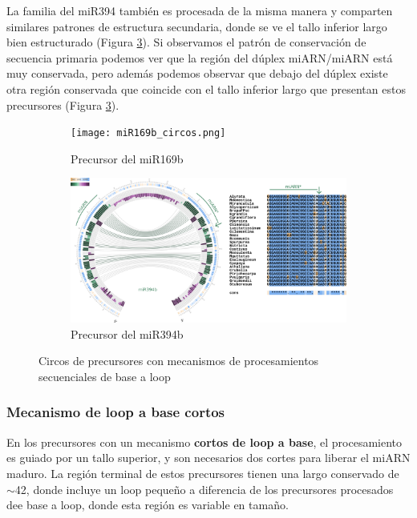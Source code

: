 La familia del miR394 también es procesada de la misma manera y comparten similares patrones de estructura secundaria, donde se ve el tallo inferior largo bien estructurado (Figura \ref{fig:seqBTL_circos}).
Si observamos el patrón de conservación de secuencia primaria podemos ver que la región del dúplex miARN/miARN está muy conservada, pero además podemos observar que debajo del dúplex existe otra región conservada que coincide con el tallo inferior largo que presentan estos precursores (Figura \ref{fig:seqBTL_circos}).


\begin{landscape}
	\begin{figure}
	\centering
	\begin{subfigure}{.75\textwidth}
	  \centering
	  \texttt{[image: miR169b\_circos.png]}
	  \caption{Precursor del miR169b}
	  \label{subfig:miR169b_circos}
	\end{subfigure}%
	\begin{subfigure}{.75\textwidth}
	  \centering
	  \includegraphics[width=.9\linewidth]{miR394b_circos.png}
	  \caption{Precursor del miR394b}
	  \label{subfig:miR394b_circos}
	\end{subfigure}
	\caption{Circos de precursores con mecanismos de procesamientos secuenciales de base a loop}
	\label{fig:seqBTL_circos}
	\end{figure}
\end{landscape}


\subsubsection{Mecanismo de loop a base cortos}

En los precursores con un mecanismo \textbf{cortos de loop a base}, el procesamiento es guiado por un tallo superior, y son necesarios dos cortes para liberar el miARN maduro.
La región terminal de estos precursores tienen una largo conservado de $\sim$42, donde incluye un loop pequeño \citep{Bologna2013} a diferencia de los precursores procesados dee base a loop, donde esta región es variable en tamaño.

